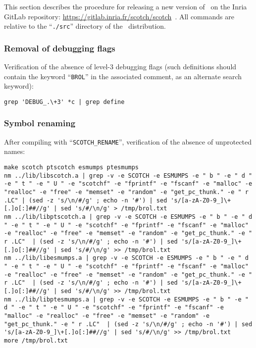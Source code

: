 This section describes the procedure for releasing a new version of
\scotch\ on the Inria GitLab repository:
\url{https://gitlab.inria.fr/scotch/scotch}~.
All commands are relative to the ``\texttt{./src}'' directory of the
\scotch\ distribution.

\subsubsection{Removal of debugging flags}

Verification of the absence of level-3 debugging flags (such definitions
should contain the keyword ``\texttt{BROL}'' in the associated
comment, as an alternate search keyword):

\begin{lstlisting}
grep 'DEBUG_.\+3' *c | grep define
\end{lstlisting}

\subsubsection{Symbol renaming}

After compiling with ``\texttt{SCOTCH\_\lbt RENAME}'', verification of
the absence of unprotected names:

\begin{lstlisting}
make scotch ptscotch esmumps ptesmumps
nm ../lib/libscotch.a | grep -v -e SCOTCH -e ESMUMPS -e " b " -e " d " -e " t " -e " U " -e "scotchf" -e "fprintf" -e "fscanf" -e "malloc" -e "realloc" -e "free" -e "memset" -e "random" -e "get_pc_thunk." -e " r .LC" | (sed -z 's/\n/#/g' ; echo -n '#') | sed 's/[a-zA-Z0-9_]\+[.]o[:]##//g' | sed 's/#/\n/g' > /tmp/brol.txt
nm ../lib/libptscotch.a | grep -v -e SCOTCH -e ESMUMPS -e " b " -e " d " -e " t " -e " U " -e "scotchf" -e "fprintf" -e "fscanf" -e "malloc" -e "realloc" -e "free" -e "memset" -e "random" -e "get_pc_thunk." -e " r .LC"  | (sed -z 's/\n/#/g' ; echo -n '#') | sed 's/[a-zA-Z0-9_]\+[.]o[:]##//g' | sed 's/#/\n/g' >> /tmp/brol.txt
nm ../lib/libesmumps.a | grep -v -e SCOTCH -e ESMUMPS -e " b " -e " d " -e " t " -e " U " -e "scotchf" -e "fprintf" -e "fscanf" -e "malloc" -e "realloc" -e "free" -e "memset" -e "random" -e "get_pc_thunk." -e " r .LC"  | (sed -z 's/\n/#/g' ; echo -n '#') | sed 's/[a-zA-Z0-9_]\+[.]o[:]##//g' | sed 's/#/\n/g' >> /tmp/brol.txt
nm ../lib/libptesmumps.a | grep -v -e SCOTCH -e ESMUMPS -e " b " -e " d " -e " t " -e " U " -e "scotchf" -e "fprintf" -e "fscanf" -e "malloc" -e "realloc" -e "free" -e "memset" -e "random" -e "get_pc_thunk." -e " r .LC"  | (sed -z 's/\n/#/g' ; echo -n '#') | sed 's/[a-zA-Z0-9_]\+[.]o[:]##//g' | sed 's/#/\n/g' >> /tmp/brol.txt
more /tmp/brol.txt
\end{lstlisting}

